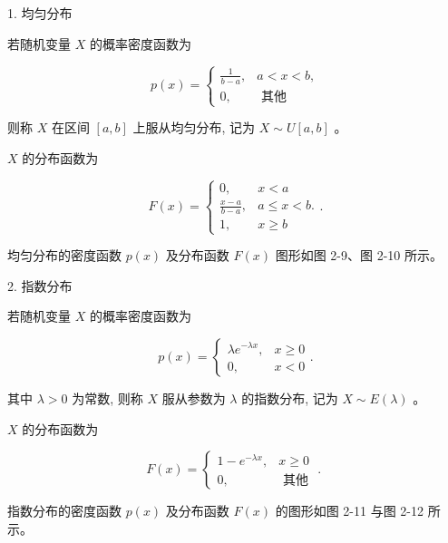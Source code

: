 \documentclass{beamer}
\begin{document}
	\begin{frame}
	1. 均匀分布
	
	若随机变量 $X$ 的概率密度函数为
	
	$$
	p(x)=\left\{\begin{array}{cc}
		\frac{1}{b-a}, & a<x<b, \\
		0, & \text { 其他 }
	\end{array}\right.
	$$
	
	则称 $X$ 在区间 $[a, b]$ 上服从均匀分布, 记为 $X \sim U[a, b]$ 。
	
	$X$ 的分布函数为
	
	$$
	F(x)=\left\{\begin{array}{cc}
		0, & x<a \\
		\frac{x-a}{b-a}, & a \leqslant x<b . \\
		1, & x \geqslant b
	\end{array} .\right.
	$$
	
	均匀分布的密度函数 $p(x)$ 及分布函数 $F(x)$ 图形如图 2-9、图 2-10 所示。
	\begin{figure}[htp]
	\centering
	\hfill%
	\end{figure}
	\end{frame}
	
	\begin{frame}
		2. 指数分布
		
		若随机变量 $X$ 的概率密度函数为
		
		$$
		p(x)=\left\{\begin{array}{ll}
			\lambda e^{-\lambda x}, & x \geqslant 0 \\
			0, & x<0
		\end{array} .\right.
		$$
		
		其中 $\lambda>0$ 为常数, 则称 $X$ 服从参数为 $\lambda$ 的指数分布, 记为 $X \sim E(\lambda)$ 。
		
		$X$ 的分布函数为
		
		$$
		F(x)=\left\{\begin{array}{cc}
			1-e^{-\lambda x}, & x \geqslant 0 \\
			0, & \text { 其他 }
		\end{array}\right. \text {. }
		$$
		
		指数分布的密度函数 $p(x)$ 及分布函数 $F(x)$ 的图形如图 2-11 与图 2-12 所示。
	\end{frame}
	
\end{document}
